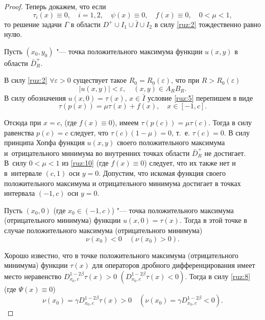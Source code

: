 \begin{proof}
Теперь докажем, что если
$$\tau_i(x)\equiv0, \quad i=1, 2, \quad \psi(x)\equiv0, \quad f(x)\equiv0, \quad 0<\mu<1,$$
то решение задачи \hyperlink{ruz:G}{$\Gamma $} в области $D^{+}\cup I_1\cup\bar I\cup I_2$ в силу \eqref{ruz:2} тождественно равно нулю.

Пусть $(x_0, y_0)$ "--- точка положительного максимума функции $u(x,y)$ в области $\bar D_R^{+}$.

В силу \eqref{ruz:2}  $\forall\varepsilon>0$ существует такое $R_0=R_0(\varepsilon)$, что при $R>R_0(\varepsilon)$
\begin{equation}
|u(x,y)|<\varepsilon, \quad (x,y)\in A_RB_R.
\label{ruz:9}
\end{equation}
В силу обозначения $u(x, 0)=\tau(x)$, $x\in\bar I$ условие \eqref{ruz:5} перепишем в виде
\begin{equation}
\tau(p(x))=\mu\tau(x)+f(x), \quad x\in[-1,c].
\label{ruz:10}
\end{equation}

Отсюда при $x=c$, (где $f(x)\equiv0$), имеем $\tau(p(c))=\mu\tau(c)$.
Тогда в силу равенства $p(c)=c$ следует, что $\tau(c)(1-\mu)=0$,
т.~е. $\tau(c)=0$. В силу принципа Хопфа \cite[с.~25]{ruz:bib:10}
функция $u(x,y)$ своего положительного максимума и~отрицательного минимума во внутренних точках
области $\bar D_R^ + $ не достигает. В~силу  $0<\mu<1$
из \eqref{ruz:10} (где $f(x)\equiv0$) следует, что их также нет и в~интервале $(c, 1)$ оси $y = 0$. 
Допустим, что искомая функция своего положительного максимума и отрицательного минимума
достигает в точках интервала $(-1, c)$ оси $y = 0$.

Пусть $(x_0, 0)$ (где $x_0\in(-1, c)$) "---  точка положительного максимума (отрицательного минимума)
функции $u(x, 0)=\tau(x)$. 
Тогда в этой точке в случае положительного максимума (отрицательного минимума) \cite[c.~74]{ruz:bib:9}
\begin{equation}
\nu(x_0)<0 \quad (\nu(x_0)>0).
\label{ruz:11}
\end{equation}

Хорошо известно, что в точке положительного максимума
(отрицательного минимума) функции $\tau (x)$ для операторов
дробного дифференцирования имеет место неравенство
$D_{x_0,c}^{1-2\beta}\tau(x)>0$ $(D_{x_0,c}^{1-2\beta}\tau(x)<0)$.
Тогда в силу \eqref{ruz:8} (где $\Psi(x)\equiv0$) 
\begin{equation}
\nu(x_0)=\gamma D_{x_0,c}^{1-2\beta}\tau(x)>0 \quad
(\nu(x_0)=\gamma D_{x_0,c}^{1-2\beta}<0).
\label{ruz:12}
\end{equation}


\end{proof}
